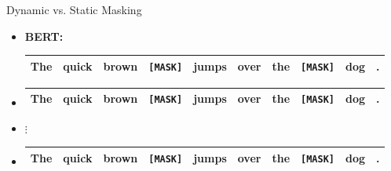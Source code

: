 \documentclass[11pt,compress,t,notes=noshow, xcolor=table]{beamer}
\begin{document}

\begin{frame}{Dynamic vs. Static Masking}

\vfill

\begin{itemize}
	\item \normalsize \textbf{BERT:}
			\footnotesize
\begin{tabular}{|cccccccccc|}
\hline
The & quick & brown & \cellcolor{blue!65}\texttt{[MASK]} & jumps & over & the & \cellcolor{blue!65}\texttt{[MASK]} & dog & . \\
\hline
\end{tabular}
	\item[] \footnotesize
\begin{tabular}{|cccccccccc|}
\hline
The & quick & brown & \cellcolor{blue!65}\texttt{[MASK]} & jumps & over & the & \cellcolor{blue!65}\texttt{[MASK]} & dog & . \\
\hline
\end{tabular}
	\item[] \begin{center}$\vdots$\end{center}
	\item[] \footnotesize
\begin{tabular}{|cccccccccc|}
\hline
The & quick & brown & \cellcolor{blue!65}\texttt{[MASK]} & jumps & over & the & \cellcolor{blue!65}\texttt{[MASK]} & dog & . \\
\hline
\end{tabular}
\end{itemize}

\vspace{.75cm}


\end{frame}
\end{document}

